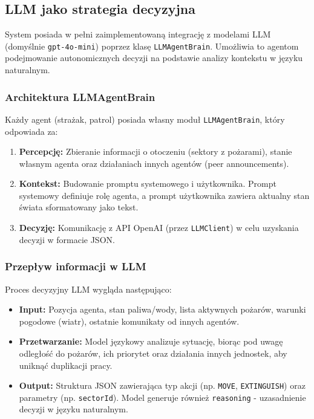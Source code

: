 \documentclass[11pt,a4paper]{article}
\begin{document}
\subsection{LLM jako strategia decyzyjna}

System posiada w pełni zaimplementowaną integrację z modelami LLM (domyślnie \texttt{gpt-4o-mini}) poprzez klasę \texttt{LLMAgentBrain}. Umożliwia to agentom podejmowanie autonomicznych decyzji na podstawie analizy kontekstu w języku naturalnym.

\subsubsection{Architektura LLMAgentBrain}

Każdy agent (strażak, patrol) posiada własny moduł \texttt{LLMAgentBrain}, który odpowiada za:
\begin{enumerate}
    \item \textbf{Percepcję:} Zbieranie informacji o otoczeniu (sektory z pożarami), stanie własnym agenta oraz działaniach innych agentów (peer announcements).
    \item \textbf{Kontekst:} Budowanie promptu systemowego i użytkownika. Prompt systemowy definiuje rolę agenta, a prompt użytkownika zawiera aktualny stan świata sformatowany jako tekst.
    \item \textbf{Decyzję:} Komunikację z API OpenAI (przez \texttt{LLMClient}) w celu uzyskania decyzji w formacie JSON.
\end{enumerate}

\subsubsection{Przepływ informacji w LLM}

Proces decyzyjny LLM wygląda następująco:
\begin{itemize}
    \item \textbf{Input:} Pozycja agenta, stan paliwa/wody, lista aktywnych pożarów, warunki pogodowe (wiatr), ostatnie komunikaty od innych agentów.
    \item \textbf{Przetwarzanie:} Model językowy analizuje sytuację, biorąc pod uwagę odległość do pożarów, ich priorytet oraz działania innych jednostek, aby uniknąć duplikacji pracy.
    \item \textbf{Output:} Struktura JSON zawierająca typ akcji (np. \texttt{MOVE}, \texttt{EXTINGUISH}) oraz parametry (np. \texttt{sectorId}). Model generuje również \texttt{reasoning} - uzasadnienie decyzji w języku naturalnym.
\end{itemize}
\end{document}
